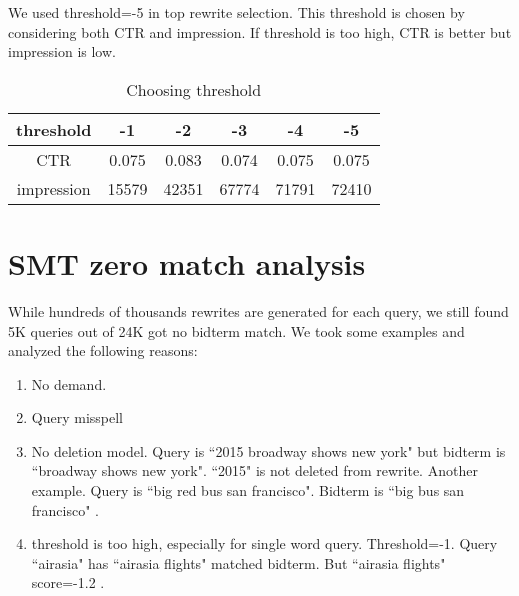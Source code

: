 \documentclass{sig-alternate}
\begin{document}
We used threshold=-5 in top rewrite selection. This threshold is chosen by considering both CTR and impression. If threshold is too high, CTR is better but impression is low.
\begin{table}
\caption{Choosing threshold}
\begin{tabular}{|c|c|c|c|c|c|} \hline
threshold & -1 & -2 & -3 & -4 & -5 \\ \hline
CTR & 0.075 & 0.083& 0.074 & 0.075 & 0.075 \\ \hline
impression & 15579 & 42351 & 67774 & 71791 & 72410 \\ \hline
\end{tabular}
\end{table}

\section{SMT zero match analysis}
While hundreds of thousands rewrites are generated for each query, we still found 5K queries out of 24K got no bidterm match. We took some examples and analyzed the following reasons:
\begin{enumerate}
\item No demand. 
\item Query misspell
\item No deletion model. Query is  ``2015 broadway shows new york" but  bidterm is ``broadway shows new york". ``2015" is not deleted from rewrite.  Another example. Query is ``big red bus san francisco". Bidterm is ``big  bus san francisco" .
\item threshold is too high, especially for single word query. Threshold=-1. Query ``airasia" has ``airasia flights" matched bidterm. But ``airasia flights" score=-1.2 .
\end{enumerate}  







\end{document}
